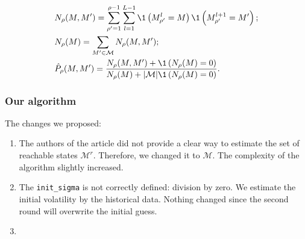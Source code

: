             \begin{align}
                & N_\rho(M, M') = \sum_{\rho' = 1}^{\rho-1} \sum_{l = 1}^{L-1} \1\left(M_{\rho'}^l = M\right) \1\left(M_{\rho'}^{l+1} = M'\right); \label{globe:rule1}\\
                & N_\rho(M) = \sum_{M'\in\mathcal{M}}N_\rho(M, M'); \label{globe:rule2}\\
                & \hat P_\rho(M, M') = \frac{N_\rho(M, M') + \1\left(N_\rho(M) = 0\right)}{N_\rho(M) + |\mathcal M|\1\left(N_\rho(M) = 0\right)}. \label{globe:rule3}
            \end{align}

        \subsubsection{Our algorithm}
            The changes we proposed:
            \begin{enumerate}
                \item The authors of the article did not provide a clear way to estimate the set of reachable states $\mathcal{M}^r$. Therefore, we changed it to $\mathcal{M}$. The complexity of the algorithm slightly increased.
                \item The \texttt{init\_sigma} is not correctly defined: division by zero. We estimate the initial volatility by the historical data. Nothing changed since the second round will overwrite the initial guess.
                \item 
            \end{enumerate}
